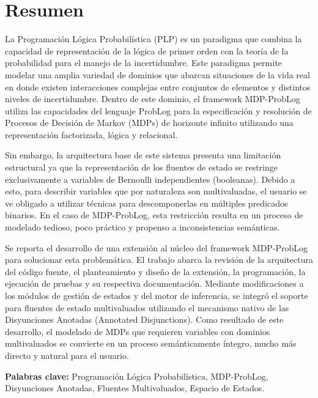 \documentclass[12pt]{article}
\begin{document}

\clearpage
\section*{\centering Resumen}

La Programación Lógica Probabilística (PLP) es un paradigma que combina la capacidad de representación de la lógica de primer orden con la teoría de la probabilidad para el manejo de la incertidumbre. Este paradigma permite modelar una amplia variedad de dominios que abarcan situaciones de la vida real en donde existen interacciones complejas entre conjuntos de elementos y distintos niveles de incertidumbre. Dentro de este dominio, el framework MDP-ProbLog utiliza las capacidades del lenguaje ProbLog para la especificación y resolución de Procesos de Decisión de Markov (MDPs) de horizonte infinito utilizando una representación factorizada, lógica y relacional.

Sin embargo, la arquitectura base de este sistema presenta una limitación estructural ya que la representación de los fluentes de estado se restringe exclusivamente a variables de Bernoulli independientes (booleanas). Debido a esto, para describir variables que por naturaleza son multivaluadas, el usuario se ve obligado a utilizar técnicas para descomponerlas en múltiples predicados binarios. En el caso de MDP-ProbLog, esta restricción resulta en un proceso de modelado tedioso, poco práctico y propenso a inconsistencias semánticas.

Se reporta el desarrollo de una extensión al núcleo del framework MDP-ProbLog para solucionar esta problemática. El trabajo abarca la revisión de la arquitectura del código fuente, el planteamiento y diseño de la extensión, la programación, la ejecución de pruebas y su respectiva documentación. Mediante modificaciones a los módulos de gestión de estados y del motor de inferencia, se integró el soporte para fluentes de estado multivaluados utilizando el mecanismo nativo de las Disyunciones Anotadas (Annotated Disjunctions). Como resultado de este desarrollo, el modelado de MDPs que requieren variables con dominios multivaluados se convierte en un proceso semánticamente íntegro, mucho más directo y natural para el usuario.

\vspace{1cm}
\textbf{Palabras clave:} Programación Lógica Probabilística, MDP-ProbLog, Disyunciones Anotadas, Fluentes Multivaluados, Espacio de Estados.
\end{document}
